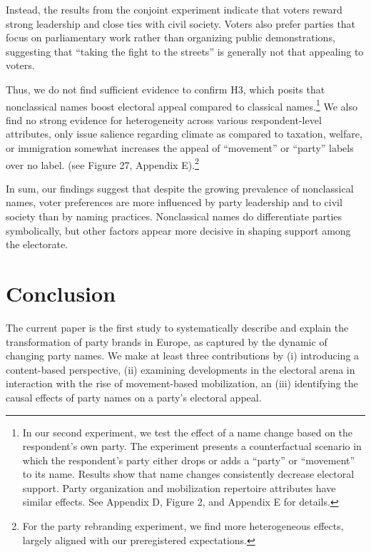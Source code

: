 \documentclass[12pt]{article}
\begin{document}
Instead, the results from the conjoint experiment indicate that voters reward strong leadership and close ties with civil society.  Voters also prefer parties that focus on parliamentary work rather than organizing public demonstrations, suggesting that ``taking the fight to the streets'' is generally not that appealing to voters.

Thus, we do not find sufficient evidence to confirm H3, which posits that nonclassical names boost electoral appeal compared to classical names.\footnote{In our second experiment, we test the effect of a name change based on the respondent's own party. The experiment presents a counterfactual scenario in which the respondent's party either drops or adds a ``party'' or ``movement'' to its name. Results show that name changes consistently decrease electoral support. Party organization and mobilization repertoire attributes have similar effects. See Appendix D, Figure 2, and Appendix E for details.} We also find no strong evidence for heterogeneity across various respondent-level attributes, only issue salience regarding climate as compared to taxation, welfare, or immigration somewhat increases the appeal of ``movement'' or ``party'' labels over no label. (see Figure 27, Appendix E).\footnote{For the party rebranding experiment, we find more heterogeneous effects, largely aligned with our preregistered expectations.}

In sum, our findings suggest that despite the growing prevalence of nonclassical names, voter preferences are more influenced by party leadership and  to civil society than by naming practices. Nonclassical names do differentiate parties symbolically, but other factors appear more decisive in shaping support among the electorate.

\section{Conclusion} 

The current paper is the first study to systematically describe and explain the transformation of party brands in Europe, as captured by the dynamic of changing party names. We make at least three contributions by (i) introducing a content-based perspective, (ii) examining developments in the electoral arena in interaction with the rise of movement-based mobilization, an (iii) identifying the causal effects of party names on a party's electoral appeal.
\end{document}
